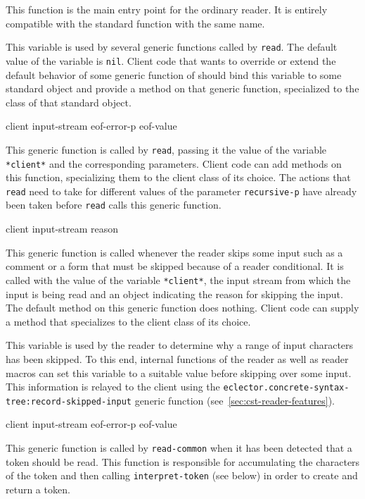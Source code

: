 This function is the main entry point for the ordinary reader.  It is
entirely compatible with the standard \commonlisp{} function with the
same name.


This variable is used by several generic functions called by
\texttt{read}.  The default value of the variable is \texttt{nil}.
Client code that wants to override or extend the default behavior of
some generic function of \sysname{} should bind this variable to some
standard object and provide a method on that generic function,
specialized to the class of that standard object.

 {client input-stream eof-error-p eof-value}

This generic function is called by \texttt{read}, passing it the value
of the variable \texttt{*client*} and the corresponding parameters.
Client code can add methods on this function, specializing them to the
client class of its choice.  The actions that \texttt{read} need to
take for different values of the parameter \texttt{recursive-p} have
already been taken before \texttt{read} calls this generic function.

 {client input-stream reason}

This generic function is called whenever the reader skips some input
such as a comment or a form that must be skipped because of a reader
conditional.  It is called with the value of the variable
\texttt{*client*}, the input stream from which the input is being read
and an object indicating the reason for skipping the input.  The
default method on this generic function does nothing.  Client code can
supply a method that specializes to the client class of its choice.


This variable is used by the reader to determine why a range of input
characters has been skipped.  To this end, internal functions of the
reader as well as reader macros can set this variable to a suitable
value before skipping over some input.  This information is relayed to
the client using the
\texttt{eclector.concrete-syntax-tree:record-skipped-input} generic
function (see~\ref{sec:cst-reader-features}).

 {client input-stream eof-error-p eof-value}

This generic function is called by \texttt{read-common} when it has
been detected that a token should be read.  This function is
responsible for accumulating the characters of the token and then
calling \texttt{interpret-token} (see below) in order to create and
return a token.

